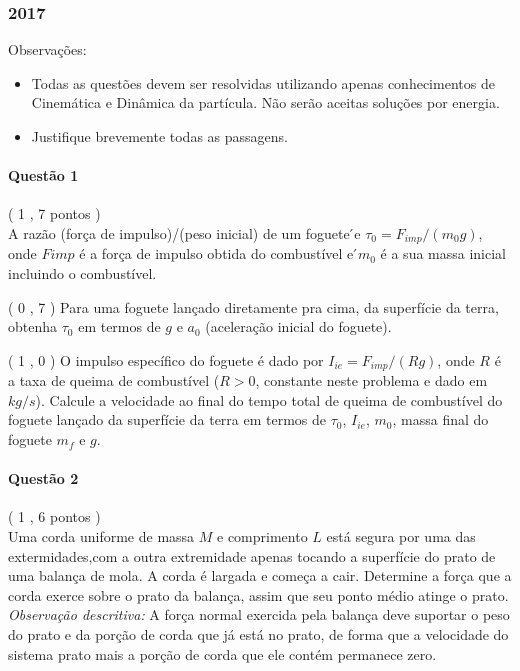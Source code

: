 \documentclass[12pt,a4paper]{article}
\begin{document}
\newpage

\subsubsection{2017}

Observa\c{c}\~oes:

\begin{itemize}
\item Todas as quest\~oes devem ser resolvidas utilizando apenas conhecimentos de Cinem\'atica e Din\^amica da part\'icula. N\~ao ser\~ao aceitas solu\c{c}\~oes por energia.

\item Justifique brevemente todas as passagens.
\end{itemize}

\paragraph{Quest\~ao 1} ( 1 , 7 pontos )\\
\indent A raz\~ao (for\c{c}a de impulso)/(peso inicial) de um foguete ́e $\tau_0 = F_{imp}/(m_0g)$, onde $F{imp}$ \'e a for\c{c}a de impulso obtida do combust\'ivel e ́$m_0$ \'e a sua massa inicial incluindo o combust\'ivel.

\begin{tasks}

\task ( 0 , 7 ) Para uma foguete lan\c{c}ado diretamente pra cima, da superf\'icie da terra, obtenha $\tau_0$ em termos de $g$ e $a_0$ (acelera\c{c}\~ao inicial do foguete).

\task ( 1 , 0 ) O impulso espec\'ifico do foguete \'e dado por $I_{ie} = F_{imp}/(Rg)$, onde $R$ \'e a taxa de queima de combust\'ivel ($R>0$, constante neste problema e dado em $kg/s$). Calcule a velocidade ao final do tempo total de queima de combust\'ivel do foguete lan\c{c}ado da superf\'icie da terra em termos de $\tau_0$, $I_{ie}$, $m_0$, massa final do foguete $m_f$ e $g$.

\end{tasks}
\paragraph{Quest\~ao 2} ( 1 , 6 pontos )\\
\indent Uma corda uniforme de massa $M$ e comprimento $L$ est\'a segura por uma das extermidades,com a outra extremidade apenas tocando a superf\'icie do prato de uma balan\c{c}a de mola. A corda \'e largada e come\c{c}a a cair. Determine a for\c{c}a que a corda exerce sobre o prato da balan\c{c}a, assim que seu ponto m\'edio atinge o prato. \textit{Observa\c{c}\~ao descritiva:} A for\c{c}a normal exercida pela balan\c{c}a deve suportar o peso do prato e da por\c{c}\~ao de corda que j\'a est\'a no prato, de forma que a velocidade do sistema prato mais a por\c{c}\~ao de corda que ele cont\'em permanece zero.\\
\end{document}
